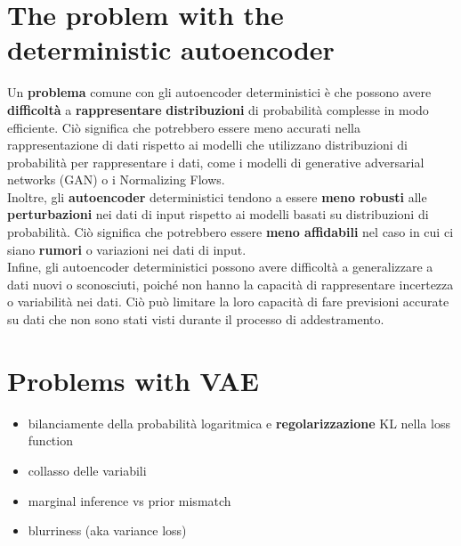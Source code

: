 \documentclass{article}
\begin{document}
\section{The problem with the deterministic autoencoder}
Un \textbf{problema} comune con gli autoencoder deterministici è che possono avere \textbf{difficoltà} a \textbf{rappresentare} \textbf{distribuzioni} di probabilità complesse in modo efficiente. Ciò significa che potrebbero essere meno accurati nella rappresentazione di dati rispetto ai modelli che utilizzano distribuzioni di probabilità per rappresentare i dati, come i modelli di generative adversarial networks (GAN) o i Normalizing Flows.
\\
Inoltre, gli \textbf{autoencoder} deterministici tendono a essere \textbf{meno robusti} alle \textbf{perturbazioni} nei dati di input rispetto ai modelli basati su distribuzioni di probabilità. Ciò significa che potrebbero essere \textbf{meno affidabili} nel caso in cui ci siano \textbf{rumori} o variazioni nei dati di input.
\\
Infine, gli autoencoder deterministici possono avere difficoltà a generalizzare a dati nuovi o sconosciuti, poiché non hanno la capacità di rappresentare incertezza o variabilità nei dati. Ciò può limitare la loro capacità di fare previsioni accurate su dati che non sono stati visti durante il processo di addestramento.

\section{Problems with VAE}
\begin{itemize}
    \item bilanciamente della probabilità logaritmica e \textbf{regolarizzazione} KL nella loss function
    \item collasso delle variabili
    \item marginal inference vs prior mismatch
    \item blurriness (aka variance loss)
\end{itemize}
\end{document}
